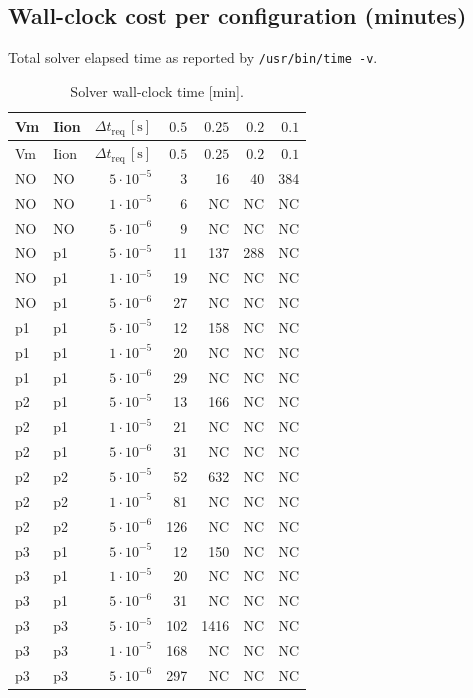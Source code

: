 \documentclass[11pt,a4paper]{article}
\begin{document}
	
\subsection{Wall-clock cost per configuration (minutes)}

Total solver elapsed time as reported by \texttt{/usr/bin/time -v}.
\begin{center}\footnotesize
\begin{longtable}{llrrrrr}
\caption{Solver wall-clock time [min].}\\
\toprule
Vm & Iion & $\Delta t_{\text{req}}\,[\text{s}]$ & $0.5$ & $0.25$ & $0.2$ & $0.1$\\
\midrule\endfirsthead\toprule
Vm & Iion & $\Delta t_{\text{req}}\,[\text{s}]$ & $0.5$ & $0.25$ & $0.2$ & $0.1$\\
\midrule\endhead
NO & NO & $5\!\cdot\!10^{-5}$ & 3 & 16 & 40 & 384 \\
NO & NO & $1\!\cdot\!10^{-5}$ & 6 & NC & NC & NC \\
NO & NO & $5\!\cdot\!10^{-6}$ & 9 & NC & NC & NC \\\hline
NO & p1 & $5\!\cdot\!10^{-5}$ & 11 & 137 & 288 & NC \\
NO & p1 & $1\!\cdot\!10^{-5}$ & 19 & NC & NC & NC \\
NO & p1 & $5\!\cdot\!10^{-6}$ & 27 & NC & NC & NC \\\hline
p1 & p1 & $5\!\cdot\!10^{-5}$ & 12 & 158 & NC & NC \\
p1 & p1 & $1\!\cdot\!10^{-5}$ & 20 & NC & NC & NC \\
p1 & p1 & $5\!\cdot\!10^{-6}$ & 29 & NC & NC & NC \\\hline
p2 & p1 & $5\!\cdot\!10^{-5}$ & 13 & 166 & NC & NC \\
p2 & p1 & $1\!\cdot\!10^{-5}$ & 21 & NC & NC & NC \\
p2 & p1 & $5\!\cdot\!10^{-6}$ & 31 & NC & NC & NC \\\hline
p2 & p2 & $5\!\cdot\!10^{-5}$ & 52 & 632 & NC & NC \\
p2 & p2 & $1\!\cdot\!10^{-5}$ & 81 & NC & NC & NC \\
p2 & p2 & $5\!\cdot\!10^{-6}$ & 126 & NC & NC & NC \\\hline
p3 & p1 & $5\!\cdot\!10^{-5}$ & 12 & 150 & NC & NC \\
p3 & p1 & $1\!\cdot\!10^{-5}$ & 20 & NC & NC & NC \\
p3 & p1 & $5\!\cdot\!10^{-6}$ & 31 & NC & NC & NC \\\hline
p3 & p3 & $5\!\cdot\!10^{-5}$ & 102 & 1416 & NC & NC \\
p3 & p3 & $1\!\cdot\!10^{-5}$ & 168 & NC & NC & NC \\
p3 & p3 & $5\!\cdot\!10^{-6}$ & 297 & NC & NC & NC \\
\bottomrule\end{longtable}\end{center}
\end{document}
